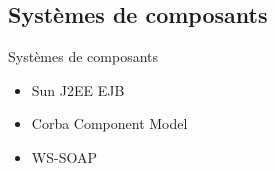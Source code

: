 \section{\sectitle}
\begin{frame}{\sectitle}
    \def\subsectitle{Systèmes de composants}
    \subsection{\subsectitle}
    \begin{block}{\subsectitle}
        \begin{itemize}
            \item Sun  J2EE EJB
            \item Corba Component Model
            \item WS-SOAP
        \end{itemize}
    \end{block}
\end{frame}

\def\sectitle{Problèmes de réalisation}
